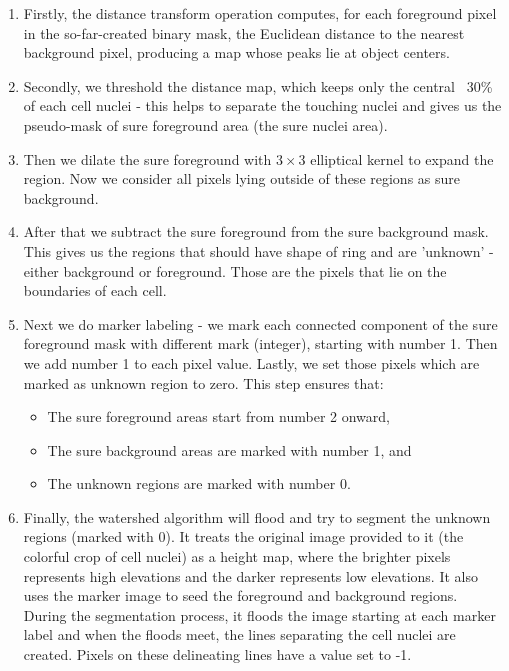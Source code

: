 \begin{enumerate}
    \item Firstly, the distance transform operation computes, for each foreground pixel in the so-far-created binary mask, the Euclidean distance to the nearest background pixel, producing a map whose peaks lie at object centers.
    \item Secondly, we threshold the distance map, which keeps only the central ~30\% of each cell nuclei - this helps to separate the touching nuclei and gives us the pseudo-mask of sure foreground area (the sure nuclei area).
    \item Then we dilate the sure foreground with $3\times3$ elliptical kernel to expand the region. Now we consider all pixels lying outside of these regions as sure background.
    \item After that we subtract the sure foreground from the sure background mask. This gives us the regions that should have shape of ring and are 'unknown' - either background or foreground. Those are the pixels that lie on the boundaries of each cell.
    \item Next we do marker labeling - we mark each connected component of the sure foreground mask with different mark (integer), starting with number 1. Then we add number 1 to each pixel value. Lastly, we set those pixels which are marked as unknown region to zero. This step ensures that:
    \begin{itemize}
        \item The sure foreground areas start from number 2 onward,
        \item The sure background areas are marked with number 1, and
        \item The unknown regions are marked with number 0.
    \end{itemize}
    \item Finally, the watershed algorithm will flood and try to segment the unknown regions (marked with 0). It treats the original image provided to it (the colorful crop of cell nuclei) as a height map, where the brighter pixels represents high elevations and the darker represents low elevations. It also uses the marker image to seed the foreground and background regions. During the segmentation process, it floods the image starting at each marker label and when the floods meet, the lines separating the cell nuclei are created. Pixels on these delineating lines have a value set to -1.
\end{enumerate}

